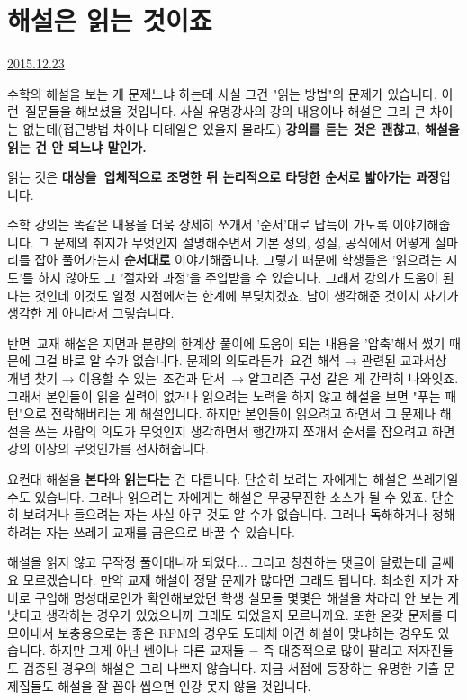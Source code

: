 \section{해설은 읽는 것이죠}
\href{https://www.kockoc.com/Apoc/559722}{2015.12.23}

\vspace{5mm}

수학의 해설을 보는 게 문제느냐 하는데 사실 그건 "읽는 방법"의 문제가 있습니다.
이런 질문들을 해보셨을 것입니다.
사실 유명강사의 강의 내용이나 해설은 그리 큰 차이는 없는데(접근방법 차이나 디테일은 있을지 몰라도)
\textbf{강의를 듣는 것은 괜찮고, 해설을 읽는 건 안 되느냐 말인가.}
\vspace{5mm}

읽는 것은 \textbf{대상을 입체적으로 조명한 뒤 논리적으로 타당한 순서로 밟아가는 과정}입니다.
\vspace{5mm}

수학 강의는 똑같은 내용을 더욱 상세히 쪼개서 '순서'대로 납득이 가도록 이야기해줍니다.
그 문제의 취지가 무엇인지 설명해주면서 기본 정의, 성질, 공식에서 어떻게 실마리를 잡아 풀어가는지 \textbf{순서대로} 이야기해줍니다.
그렇기 때문에 학생들은 '읽으려는 시도'를 하지 않아도 그 '절차와 과정'을 주입받을 수 있습니다.
그래서 강의가 도움이 된다는 것인데 이것도 일정 시점에서는 한계에 부딪치겠죠. 남이 생각해준 것이지 자기가 생각한 게 아니라서 그렇습니다.
\vspace{5mm}

반면 교재 해설은 지면과 분량의 한계상 풀이에 도움이 되는 내용을 '압축'해서 썼기 때문에 그걸 바로 알 수가 없습니다.
문제의 의도라든가 요건 해석 → 관련된 교과서상 개념 찾기 → 이용할 수 있는 조건과 단서 → 알고리즘 구성 같은 게 간략히 나와잇죠.
그래서 본인들이 읽을 실력이 없거나 읽으려는 노력을 하지 않고 해설을 보면 "푸는 패턴"으로 전락해버리는 게 해설입니다.
하지만 본인들이 읽으려고 하면서 그 문제나 해설을 쓰는 사람의 의도가 무엇인지 생각하면서 행간까지 쪼개서 순서를 잡으려고 하면
강의 이상의 무엇인가를 선사해줍니다.
\vspace{5mm}

요컨대 해설을 \textbf{본다}와 \textbf{읽는다는} 건 다릅니다.
단순히 보려는 자에게는 해설은 쓰레기일 수도 있습니다.
그러나 읽으려는 자에게는 해설은 무궁무진한 소스가 될 수 있죠.
단순히 보려거나 들으려는 자는 사실 아무 것도 알 수가 없습니다.
그러나 독해하거나 청해하려는 자는 쓰레기 교재를 금은으로 바꿀 수 있습니다.
\vspace{5mm}

해설을 읽지 않고 무작정 풀어대니까 되었다... 그리고 칭찬하는 댓글이 달렸는데 글쎄요 모르겠습니다.
만약 교재 해설이 정말 문제가 많다면 그래도 됩니다. 최소한 제가 자비로 구입해 명성대로인가 확인해보았던 학생 실모들 몇몇은
해설을 차라리 안 보는 게 낫다고 생각하는 경우가 있었으니까 그래도 되었을지 모르니까요.
또한 온갖 문제를 다 모아내서 보충용으로는 좋은 RPM의 경우도 도대체 이건 해설이 맞냐하는 경우도 있습니다.
하지만 그게 아닌 쎈이나 다른 교재들 $-$ 즉 대중적으로 많이 팔리고 저자진들도 검증된 경우의 해설은 그리 나쁘지 않습니다.
지금 서점에 등장하는 유명한 기출 문제집들도 해설을 잘 꼽아 씹으면 인강 못지 않을 것입니다.
\vspace{5mm}

